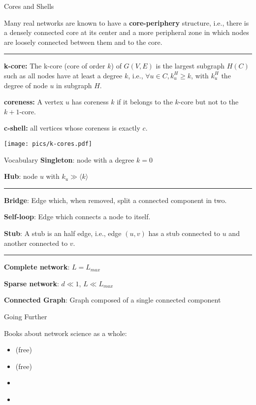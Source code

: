 \begin{textbox}{Cores and Shells}

    Many real networks are known to have a \textbf{core-periphery} structure, i.e., there is a densely connected core at its center and a more peripheral zone in which nodes are loosely connected between them and to the core.

    \noindent\rule{4cm}{0.1pt}

    \textbf{k-core:} The  k-core (core of order $k$) of $G(V,E)$ is the largest subgraph $H(C)$ such as all nodes have at least a degree $k$, i.e.,  $\forall u \in C, {k}^H_u \geq k$, with $k^H_u$ the degree of node $u$ in subgraph $H$.

    \textbf{coreness:} A vertex $u$ has coreness $k$ if it belongs to the $k$-core but not to the $k+1$-core.

    \textbf{c-shell:} all vertices whose coreness is exactly $c$.

    \centering
    \texttt{[image: pics/k-cores.pdf]}

\end{textbox}

\begin{textbox}{Vocabulary}
    \textbf{Singleton}: node with a degree $k=0$

    \textbf{Hub}: node $u$ with $k_u \gg \langle k \rangle$

    \noindent\rule{4cm}{0.1pt}

    \textbf{Bridge}: Edge which, when removed, split a connected component in two.

    \textbf{Self-loop}: Edge which connects a node to itself.

    \textbf{Stub}: A stub is an half edge, i.e., edge $(u,v)$ has a stub connected to $u$ and another connected to $v$.


    \noindent\rule{4cm}{0.1pt}

    \textbf{Complete network}: $L=L_{max}$

    \textbf{Sparse network}: $d \ll 1$, $ L \ll L_{max}$

    \textbf{Connected Graph}: Graph composed of a single connected component


\end{textbox}

\begin{textbox}{Going Further}

    Books about network science as a whole:
    \begin{itemize}
        \item\cite{barabasi2016network} (free)
        \item \cite{coscia2021atlas} (free)
        \item \cite{zinoviev2018complex}
        \item \cite{menczer2020first}
    \end{itemize}

\end{textbox}